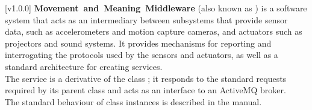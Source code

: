 [v1.0.0]
\textbf{Movement~and~Meaning~Middleware} (also known as \mplusm) is a software system
that acts as an intermediary between subsystems that provide sensor data, such as
accelerometers and motion capture cameras, and actuators such as projectors and sound
systems.
It provides mechanisms for reporting and interrogating the protocols used by the sensors
and actuators, as well as a standard architecture for creating services.\\

The \SMO{} service is a derivative of the \mplusm{} class ;
it responds to the standard requests required by its parent class and acts as an interface
to an ActiveMQ broker.\\

The standard behaviour of  class instances is described in
the \emph{\MMM} manual.
\primaryEnd{}
